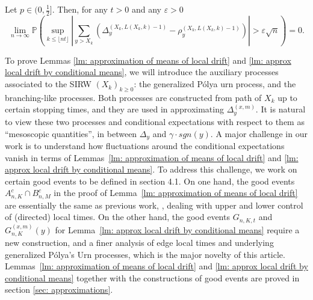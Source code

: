 \documentclass[EJP]{ejpecp} %
\newcommand{\abs}[1]{\left\vert #1 \right\vert}
\begin{document}
\begin{lemma}\label{lm: approx local drift by conditional means}
	Let $p\in (0,\frac{1}{2}]$. Then, for any $t>0$ and any $\varepsilon >0$
	\begin{equation}
		\lim_{n \to \infty }\mathbb{P}\left(\sup_{k\leq\lfloor nt \rfloor} \abs{\sum_{y> X_k} \left(\Delta_{y}^{(X_k,L(X_k,k)-1)}- \rho_{y}^{(X_k,L(X_k,k)-1)} \right)   }  > \varepsilon \sqrt{n}  \right) =0. 
	\end{equation}
\end{lemma}



To prove Lemmas \ref{lm: approximation of means of local drift} and \ref{lm: approx local drift by conditional means}, we will introduce the auxiliary processes associated to the SIRW $(X_k)_{k\geq 0}$: the generalized P\'{o}lya urn process, and the branching-like processes. Both processes are constructed from path of $X_k$ up to certain stopping times, and they are used in approximating $\Delta_{y}^{(x,m)}$.
It is natural to view these two processes and conditional expectations with respect to them as ``mesoscopic quantities'', in between $\Delta_y$ and $\gamma\cdot sgn(y)$.
A major challenge in our work is to understand how fluctuations around the conditional expectations vanish in terms of Lemmas~\ref{lm: approximation of means of local drift} and \ref{lm: approx local drift by conditional means}.
To address this challenge, we work on certain good events to be defined in section 4.1.
On one hand, the good events $A_{n, K}^c \cap B_{n, M}^c$ in the proof of Lemma~\ref{lm: approximation of means of local drift} are essentially the same as previous work, \cite{KMP23}, dealing with upper and lower control of (directed) local times. 
On the other hand, the good events $G_{n, K, t}$ and $G_{n, K}^{(x, m)}(y)$ for Lemma~\ref{lm: approx local drift by conditional means} require a new construction, and a finer analysis of edge local times and underlying generalized P\'olya’s Urn processes, which is the major novelty of this article. 
Lemmas~\ref{lm: approximation of means of local drift} and \ref{lm: approx local drift by conditional means} together with the constructions of good events are proved in section \ref{sec: approximations}.
\end{document}
